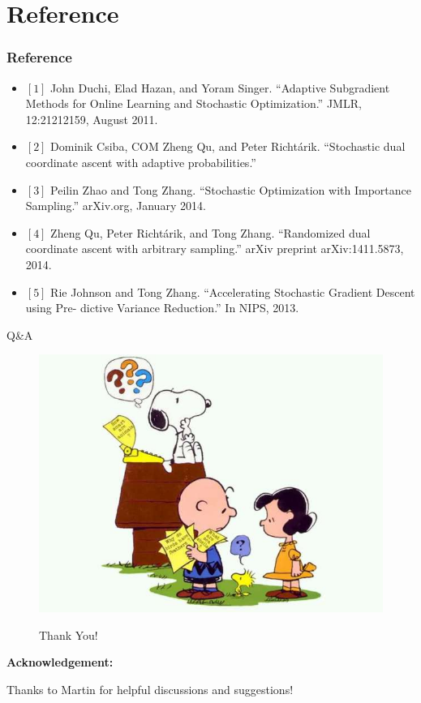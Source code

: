 \section{Reference}
\begin{frame}[fragile]
\frametitle{Reference}
\begin{itemize}
\item[] $\left[1\right]$ John Duchi, Elad Hazan, and Yoram Singer. ``Adaptive Subgradient Methods for Online Learning and Stochastic Optimization.'' JMLR, 12:21212159, August 2011.

\item[] $\left[2\right]$ Dominik Csiba, COM Zheng Qu, and Peter Richt\'arik. ``Stochastic dual coordinate ascent with adaptive probabilities.''

\item[] $\left[3\right]$ Peilin Zhao and Tong Zhang. ``Stochastic Optimization with Importance Sampling.'' arXiv.org, January 2014.

\item[] $\left[4\right]$ Zheng Qu, Peter Richt\'arik, and Tong Zhang. ``Randomized dual coordinate ascent with arbitrary sampling.'' arXiv preprint arXiv:1411.5873, 2014.

\item[] $\left[5\right]$ Rie Johnson and Tong Zhang. ``Accelerating Stochastic Gradient Descent using Pre- dictive Variance Reduction.'' In NIPS, 2013.

\end{itemize}
\end{frame}

\begin{frame}{Q\&A}
\begin{figure}[htbp]
    \begin{multicols}{2}
    \includegraphics[height=0.4\textheight]{images/question.jpg}

    \Huge{Thank You!}
    \end{multicols}
\end{figure}

\textbf{Acknowledgement:}

Thanks to Martin for helpful discussions and suggestions!

\end{frame}

